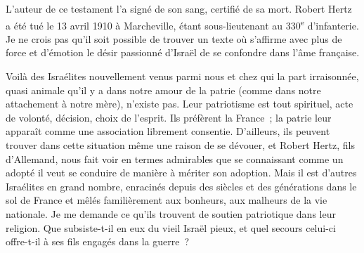 \documentclass[french,twoside]{book} %
\begin{document}
\noindent L’auteur de ce testament l’a signé de son sang, certifié de sa mort. Robert Hertz a été tué le 13 avril 1910 à Marcheville, étant sous-lieutenant au 330\textsuperscript{e} d’infanterie. Je ne crois pas qu’il soit possible de trouver un texte où s’affirme avec plus de force et d’émotion le désir passionné d’Israël de se confondre dans l’âme française.‌\par
Voilà des Israélites nouvellement venus parmi nous et chez qui la part irraisonnée, quasi animale qu’il y a dans notre amour de la patrie (comme dans notre attachement à notre mère), n’existe pas. Leur patriotisme est tout spirituel, acte de volonté, décision, choix de l’esprit. Ils préfèrent la France ; la patrie leur apparaît comme une association librement consentie. D’ailleurs, ils peuvent trouver dans cette situation même une raison de se dévouer, et Robert Hertz, fils d’Allemand, nous fait voir en termes admirables que se connaissant comme un adopté il veut se conduire de manière à mériter son adoption. Mais il est d’autres Israélites en grand nombre, enracinés depuis des siècles et des générations dans le sol de France et mêlés familièrement aux bonheurs, aux malheurs de la vie nationale. Je me demande ce qu’ils trouvent de soutien patriotique dans leur religion. Que subsiste-t-il en eux du vieil Israël pieux, et quel secours celui-ci offre-t-il à ses fils engagés dans la guerre ?‌\par
\end{document}
